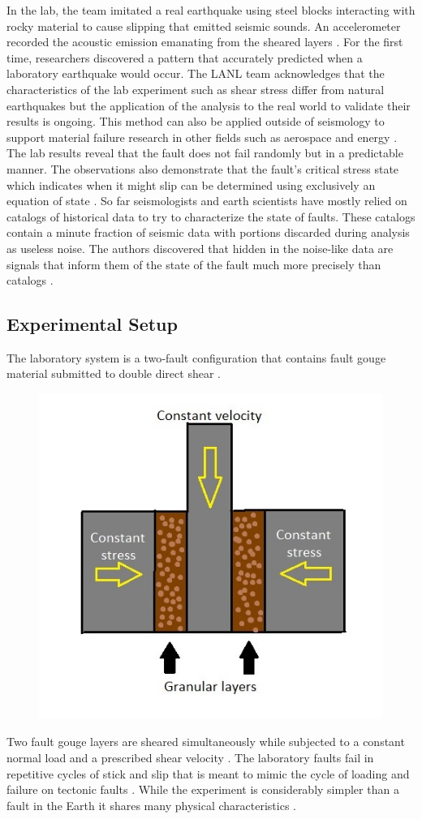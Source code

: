 \documentclass[]{llncs} %
\begin{document}
In the lab, the team imitated a real earthquake using steel blocks interacting with rocky material to cause slipping that emitted seismic sounds. An accelerometer recorded the acoustic emission emanating from the sheared layers \cite{LANLNews}. For the first time, researchers discovered a pattern that accurately predicted when a laboratory earthquake would occur. The LANL team acknowledges that the characteristics of the lab experiment such as shear stress differ from natural earthquakes but the application of the analysis to the real world to validate their results is ongoing. This method can also be applied outside of seismology to support material failure research in other fields such as aerospace and energy \cite{LANLNews}. The lab results reveal that the fault does not fail randomly but in a predictable manner. The observations also demonstrate that the fault’s critical stress state which indicates when it might slip can be determined using exclusively an equation of state \cite{LANLNews}. So far seismologists and earth scientists have mostly relied on catalogs of historical data to try to characterize the state of faults. These catalogs contain a minute fraction of seismic data with portions discarded during analysis as useless noise. The authors discovered that hidden in the noise-like data are signals that inform them of the state of the fault much more precisely than catalogs \cite{LANLNews}. \par
\subsection{Experimental Setup}
The laboratory system is a two‐fault configuration that contains fault gouge material submitted to double direct shear \cite{kaggle}. \par
\begin{figure}[h]
	\centering
	\includegraphics[width=.6\linewidth]{lab}
	\caption{}
	\label{fig:lab}
\end{figure}
Two fault gouge layers are sheared simultaneously while subjected to a constant normal load and a prescribed shear velocity \cite{kaggle}. The laboratory faults fail in repetitive cycles of stick and slip that is meant to mimic the cycle of loading and failure on tectonic faults \cite{kaggle}. While the experiment is considerably simpler than a fault in the Earth it shares many physical characteristics \cite{kaggle}. \par
\end{document}
